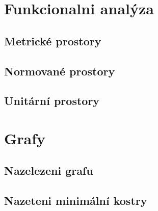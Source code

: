 \documentclass[12pt,a4paper,notitlepage,final]{article}
\begin{document}
\section{Funkcionalni analýza}
\subsection{Metrické prostory}                	
\subsection{Normované prostory}                	
\subsection{Unitární prostory}                	

\section{Grafy}
\subsection{Nazelezeni grafu}                	
\subsection{Nazeteni minimální kostry} 				
\end{document}
